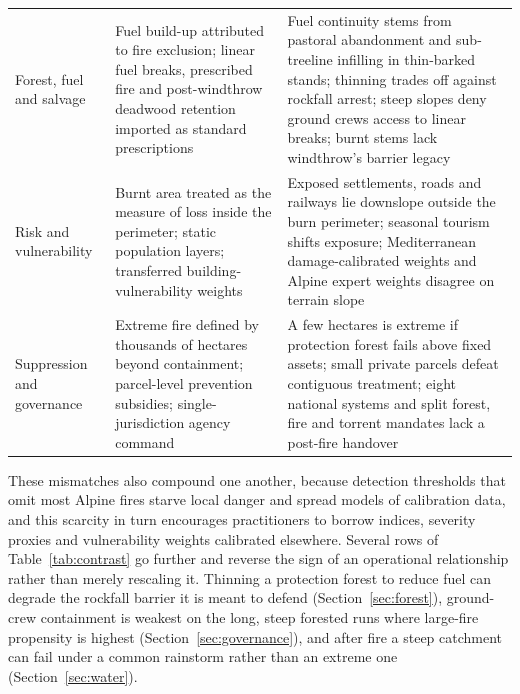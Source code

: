 \documentclass[11pt,a4paper]{article}
\begin{document}
\begin{table}[htbp]
\begin{tabularx}{\textwidth}{@{}>{\raggedright\arraybackslash}p{2.2cm} >{\raggedright\arraybackslash}X >{\raggedright\arraybackslash}X@{}}
Forest, fuel and salvage & Fuel build-up attributed to fire exclusion; linear fuel breaks, prescribed fire and post-windthrow deadwood retention imported as standard prescriptions & Fuel continuity stems from pastoral abandonment and sub-treeline infilling in thin-barked stands; thinning trades off against rockfall arrest; steep slopes deny ground crews access to linear breaks; burnt stems lack windthrow's barrier legacy \\[3pt]
Risk and vulnerability & Burnt area treated as the measure of loss inside the perimeter; static population layers; transferred building-vulnerability weights & Exposed settlements, roads and railways lie downslope outside the burn perimeter; seasonal tourism shifts exposure; Mediterranean damage-calibrated weights and Alpine expert weights disagree on terrain slope \\[3pt]
Suppression and governance & Extreme fire defined by thousands of hectares beyond containment; parcel-level prevention subsidies; single-jurisdiction agency command & A few hectares is extreme if protection forest fails above fixed assets; small private parcels defeat contiguous treatment; eight national systems and split forest, fire and torrent mandates lack a post-fire handover \\
\bottomrule
\end{tabularx}
\end{table}

These mismatches also compound one another, because detection thresholds that omit most Alpine fires starve local danger and spread models of calibration data, and this scarcity in turn encourages practitioners to borrow indices, severity proxies and vulnerability weights calibrated elsewhere. Several rows of Table~\ref{tab:contrast} go further and reverse the sign of an operational relationship rather than merely rescaling it. Thinning a protection forest to reduce fuel can degrade the rockfall barrier it is meant to defend (Section~\ref{sec:forest}), ground-crew containment is weakest on the long, steep forested runs where large-fire propensity is highest (Section~\ref{sec:governance}), and after fire a steep catchment can fail under a common rainstorm rather than an extreme one (Section~\ref{sec:water}).
\end{document}
